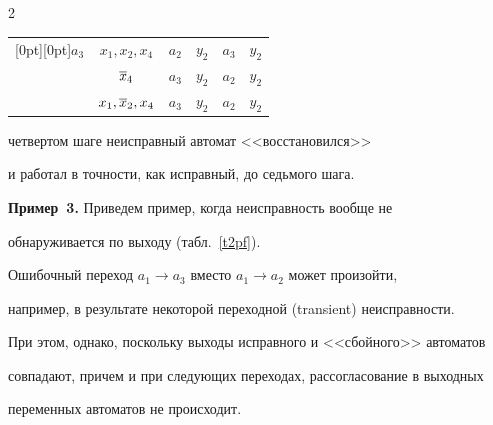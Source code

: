 \begin{multicols}{2}
\begin{enumerate}[(1)]
\begin{table}
\begin{center}
\begin{tabular}{|c|c|c|c|c|c|}


\multicolumn{1}{|c|}{\raisebox{-6pt}[0pt][0pt]{$a_3$}} & $x_1,x_2,x_4$ & $a_2$ & $y_2$ & $a_3$ & $y_2$ \\




 & $\overline x_4$ & $a_3$ & $y_2$ & $a_2$ & $y_2$ \\




 & $x_1,\overline x_2,x_4$ & $a_3$ & $y_2$ & $a_2$ & $y_2$ \\


\hline


\end{tabular}


\end{center}


\end{table}


четвертом шаге неисправный автомат <<восстановился>>


и работал в точности, как исправный, до седьмого шага.


\end{enumerate}












\medskip





\noindent


{\bf Пример~3.} Приведем пример, когда неисправность вообще не


обнаруживается по выходу (табл.~\ref{t2pf}).


Ошибочный переход $a_1 \to a_3$ вместо $a_1 \to a_2$ может произойти,


например, в результате некоторой переходной (transient) неисправности.


При этом, однако, поскольку выходы исправного и <<сбойного>> автоматов


совпадают, причем и при следующих переходах, рассогласование в выходных


переменных автоматов не происходит.











\end{multicols}
